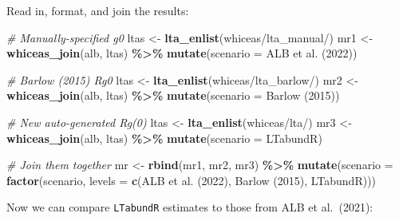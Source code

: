 \documentclass[
]{book}
\newenvironment{Shaded}{\begin{snugshade}}{\end{snugshade}}
\newcommand{\AttributeTok}[1]{\textcolor[rgb]{0.13,0.29,0.53}{#1}}
\newcommand{\CommentTok}[1]{\textcolor[rgb]{0.56,0.35,0.01}{\textit{#1}}}
\newcommand{\FunctionTok}[1]{\textcolor[rgb]{0.13,0.29,0.53}{\textbf{#1}}}
\newcommand{\NormalTok}[1]{#1}
\newcommand{\OtherTok}[1]{\textcolor[rgb]{0.56,0.35,0.01}{#1}}
\newcommand{\SpecialCharTok}[1]{\textcolor[rgb]{0.81,0.36,0.00}{\textbf{#1}}}
\newcommand{\StringTok}[1]{\textcolor[rgb]{0.31,0.60,0.02}{#1}}
\begin{document}
Read in, format, and join the results:

\begin{Shaded}
\begin{Highlighting}[]
\CommentTok{\# Manually{-}specified g0}
\NormalTok{ltas }\OtherTok{\textless{}{-}} \FunctionTok{lta\_enlist}\NormalTok{(}\StringTok{\textquotesingle{}whiceas/lta\_manual/\textquotesingle{}}\NormalTok{)}
\NormalTok{mr1 }\OtherTok{\textless{}{-}} \FunctionTok{whiceas\_join}\NormalTok{(alb, ltas) }\SpecialCharTok{\%\textgreater{}\%} \FunctionTok{mutate}\NormalTok{(}\AttributeTok{scenario =} \StringTok{\textquotesingle{}ALB et al. (2022)\textquotesingle{}}\NormalTok{)}

\CommentTok{\# Barlow (2015) Rg0}
\NormalTok{ltas }\OtherTok{\textless{}{-}} \FunctionTok{lta\_enlist}\NormalTok{(}\StringTok{\textquotesingle{}whiceas/lta\_barlow/\textquotesingle{}}\NormalTok{)}
\NormalTok{mr2 }\OtherTok{\textless{}{-}} \FunctionTok{whiceas\_join}\NormalTok{(alb, ltas) }\SpecialCharTok{\%\textgreater{}\%} \FunctionTok{mutate}\NormalTok{(}\AttributeTok{scenario =} \StringTok{\textquotesingle{}Barlow (2015)\textquotesingle{}}\NormalTok{)}

\CommentTok{\# New auto{-}generated Rg(0)}
\NormalTok{ltas }\OtherTok{\textless{}{-}} \FunctionTok{lta\_enlist}\NormalTok{(}\StringTok{\textquotesingle{}whiceas/lta/\textquotesingle{}}\NormalTok{)}
\NormalTok{mr3 }\OtherTok{\textless{}{-}} \FunctionTok{whiceas\_join}\NormalTok{(alb, ltas) }\SpecialCharTok{\%\textgreater{}\%} \FunctionTok{mutate}\NormalTok{(}\AttributeTok{scenario =} \StringTok{\textquotesingle{}LTabundR\textquotesingle{}}\NormalTok{)}

\CommentTok{\# Join them together}
\NormalTok{mr }\OtherTok{\textless{}{-}} \FunctionTok{rbind}\NormalTok{(mr1, mr2, mr3) }\SpecialCharTok{\%\textgreater{}\%} 
  \FunctionTok{mutate}\NormalTok{(}\AttributeTok{scenario =} \FunctionTok{factor}\NormalTok{(scenario, }\AttributeTok{levels =} \FunctionTok{c}\NormalTok{(}\StringTok{\textquotesingle{}ALB et al. (2022)\textquotesingle{}}\NormalTok{,}
                                                \StringTok{\textquotesingle{}Barlow (2015)\textquotesingle{}}\NormalTok{,}
                                                \StringTok{\textquotesingle{}LTabundR\textquotesingle{}}\NormalTok{)))}
\end{Highlighting}
\end{Shaded}

Now we can compare \texttt{LTabundR} estimates to those from ALB et al.~(2021):
\end{document}
